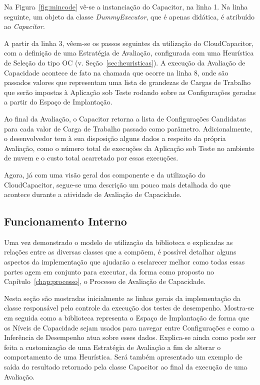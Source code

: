 Na Figura~\ref{fig:mincode} vê-se a instanciação do Capacitor, na linha 1. Na 
linha seguinte, um objeto da classe \emph{DummyExecutor}, que é apenas didática, 
é atribuído ao \emph{Capacitor}.

A partir da linha 3, vêem-se os passos seguintes da utilização do 
CloudCapacitor, com a definição de uma Estratégia de Avaliação, configurada
com uma Heurística de Seleção do tipo OC (v. Seção~\ref{sec:heuristicas}).
A execução da Avaliação de Capacidade acontece de fato na chamada que ocorre
na linha 8, onde são passados valores que representam uma lista de grandezas de
Cargas de Trabalho que serão impostas à Aplicação sob Teste rodando sobre as
Configurações geradas a partir do Espaço de Implantação.

Ao final da Avaliação, o Capacitor retorna a lista de Configurações Candidatas
para cada valor de Carga de Trabalho passado como parâmetro. Adicionalmente, o
desenvolvedor tem à sua disposição alguns dados a respeito da própria Avaliação,
como o número total de execuções da Aplicação sob Teste no ambiente de nuvem e o  
custo total acarretado por essas execuções. 

Agora, já com uma visão geral dos componente e da utilização do CloudCapacitor,
segue-se uma descrição um pouco mais detalhada do que acontece durante a atividade
de Avaliação de Capacidade.

\subsection{Funcionamento Interno}
\label{subsec:capacitor_funcionamento}
Uma vez demonstrado o modelo de utilização da biblioteca e explicadas as relações
entre as diversas classes que a compõem, é possível detalhar alguns aspectos da
implementação que ajudarão a esclarecer melhor como todas essas partes agem em
conjunto para executar, da forma como proposto no Capítulo~\ref{chap:processo},
o Processo de Avaliação de Capacidade.

Nesta seção são mostradas inicialmente as linhas gerais da implementação da classe 
responsável pelo controle da execução dos testes de desempenho. Mostra-se em 
seguida como a biblioteca representa o Espaço de Implantação de forma que os 
Níveis de Capacidade sejam usados para navegar entre Configurações e como a 
Inferência de Desempenho atua sobre esses dados. Explica-se ainda como pode ser 
feita a customização de uma Estratégia de Avaliação a fim de alterar o 
comportamento de uma Heurística. Será também apresentado um exemplo de saída do 
resultado retornado pela classe Capacitor ao final da execução de uma Avaliação.

